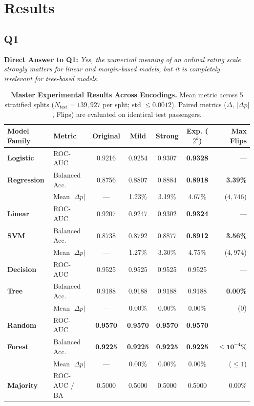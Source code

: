 \documentclass[10pt,a4paper]{article}
\begin{document}
\section{Results}

\subsection{Q1}
\textbf{Direct Answer to Q1:} \emph{Yes, the numerical meaning of an ordinal rating scale strongly matters for linear and margin-based models, but it is completely irrelevant for tree-based models.}

\begin{table}[h]
\centering
\footnotesize
\setlength{\tabcolsep}{4pt}
\caption{\textbf{Master Experimental Results Across Encodings.} Mean metric across 5 stratified splits ($N_{\text{test}} = 139{,}927$ per split; std $\le 0.0012$). Paired metrics ($\Delta$, $|\Delta p|$, Flips) are evaluated on identical test passengers.}
\label{tab:master_results}
\begin{tabular}{@{}llccccr@{}}
\toprule
\textbf{Model Family} & \textbf{Metric} & \textbf{Original} & \textbf{Mild} & \textbf{Strong} & \textbf{Exp. ($2^k$)} & \textbf{Max Flips} \\
\midrule
\textbf{Logistic}   & ROC-AUC          & 0.9216 & 0.9254 & 0.9307 & \textbf{0.9328} & --- \\
\textbf{Regression} & Balanced Acc.    & 0.8756 & 0.8807 & 0.8884 & \textbf{0.8918} & \textbf{3.39\%} \\
                    & Mean $|\Delta p|$ & ---   & 1.23\% & 3.19\% & 4.67\% & ($4{,}746$) \\
\midrule
\textbf{Linear}     & ROC-AUC          & 0.9207 & 0.9247 & 0.9302 & \textbf{0.9324} & --- \\
\textbf{SVM}        & Balanced Acc.    & 0.8738 & 0.8792 & 0.8877 & \textbf{0.8912} & \textbf{3.56\%} \\
                    & Mean $|\Delta p|$ & ---   & 1.27\% & 3.30\% & 4.75\% & ($4{,}974$) \\
\midrule
\textbf{Decision}   & ROC-AUC          & 0.9525 & 0.9525 & 0.9525 & 0.9525 & --- \\
\textbf{Tree}       & Balanced Acc.    & 0.9188 & 0.9188 & 0.9188 & 0.9188 & \textbf{0.00\%} \\
                    & Mean $|\Delta p|$ & ---   & 0.00\% & 0.00\% & 0.00\% & ($0$) \\
\midrule
\textbf{Random}     & ROC-AUC          & \textbf{0.9570} & \textbf{0.9570} & \textbf{0.9570} & \textbf{0.9570} & --- \\
\textbf{Forest}     & Balanced Acc.    & \textbf{0.9225} & \textbf{0.9225} & \textbf{0.9225} & \textbf{0.9225} & $\le \mathbf{10^{-4}\%}$ \\
                    & Mean $|\Delta p|$ & ---   & 0.00\% & 0.00\% & 0.00\% & ($\le 1$) \\
\midrule
\textbf{Majority}   & ROC-AUC / BA     & 0.5000 & 0.5000 & 0.5000 & 0.5000 & 0.00\% \\
\bottomrule
\end{tabular}
\end{table}
\end{document}
